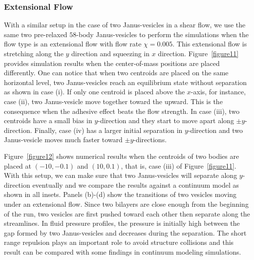 \documentclass[lineno]{jfm}
\begin{document}
\subsubsection{Extensional Flow}


With a similar setup in the case of two Janus-vesicles in a shear flow, we use the same two pre-relaxed $58$-body Janus-vesicles to perform the simulations when the flow type is an extensional flow with flow rate $\chi=0.005$. This extensional flow is stretching along the $y$ direction and squeezing in $x$ direction.
Figure~\ref{figure11} provides simulation results when the center-of-mass positions are placed differently.
One can notice that when two centroids are placed on the same horizontal level, two Janus-vesicles reach
an equilibrium state without separation as shown in case (i). If only one centroid is placed above the $x$-axis, for instance, case (ii), two Janus-vesicle move together toward the upward. This is the consequence when the adhesive effect beats the flow strength. In case (iii), two centroids have a small bias in $y$-direction and they
start to move apart along $\pm y$-direction. Finally, case (iv) has a larger initial separation in $y$-direction and two Janus-vesicle moves much faster toward $\pm y$-directions.

Figure~\ref{figure12} shows numerical results when the centroids of two bodies are placed at
$(-10,-0.1)$ and $(10,0.1)$, that is, case (iii) of Figure~\ref{figure11}. With this setup, 
we can make sure that two Janus-vesicles will separate along $y$-direction eventually and we compare the results against a continuum model as shown in all insets. 
Panels (b)-(d) show the transitions of two vesicles moving under an extensional flow.  Since two bilayers are close enough from the beginning of the run, two vesicles are first pushed toward each other then separate along the streamlines. In fluid pressure profiles, the pressure is initially high between the gap formed by two 
Janus-vesicles and decreases during the separation. The short range repulsion plays an important role to avoid structure collisions and this result can be compared with some findings in continuum modeling simulations. 







\end{document}
